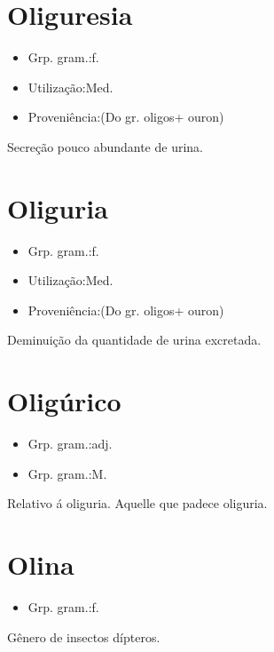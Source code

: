\section{Oliguresia}
\begin{itemize}
\item {Grp. gram.:f.}
\end{itemize}
\begin{itemize}
\item {Utilização:Med.}
\end{itemize}
\begin{itemize}
\item {Proveniência:(Do gr. \textunderscore oligos\textunderscore  + \textunderscore ouron\textunderscore )}
\end{itemize}
Secreção pouco abundante de urina.
\section{Oliguria}
\begin{itemize}
\item {Grp. gram.:f.}
\end{itemize}
\begin{itemize}
\item {Utilização:Med.}
\end{itemize}
\begin{itemize}
\item {Proveniência:(Do gr. \textunderscore oligos\textunderscore  + \textunderscore ouron\textunderscore )}
\end{itemize}
Deminuição da quantidade de urina excretada.
\section{Oligúrico}
\begin{itemize}
\item {Grp. gram.:adj.}
\end{itemize}
\begin{itemize}
\item {Grp. gram.:M.}
\end{itemize}
Relativo á oliguria.
Aquelle que padece oliguria.
\section{Olina}
\begin{itemize}
\item {Grp. gram.:f.}
\end{itemize}
Gênero de insectos dípteros.

